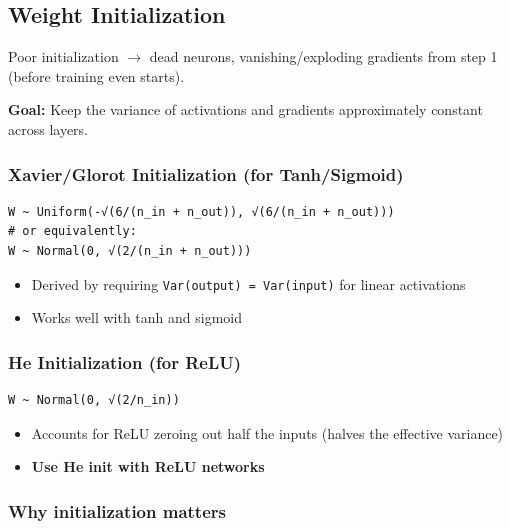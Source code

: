 \documentclass[11pt]{article}
\providecommand{\tightlist}{\setlength{\itemsep}{1pt}\setlength{\parskip}{0pt}}
\begin{document}
\subsection{Weight Initialization}\label{weight-initialization}

Poor initialization \(\rightarrow\) dead neurons, vanishing/exploding gradients from step 1 (before training even starts).

\textbf{Goal:} Keep the variance of activations and gradients approximately constant across layers.

\subsubsection{Xavier/Glorot Initialization (for Tanh/Sigmoid)}\label{xavierglorot-initialization-for-tanhsigmoid}

\setcodelang{}

\begin{verbatim}
W ~ Uniform(-√(6/(n_in + n_out)), √(6/(n_in + n_out)))
# or equivalently:
W ~ Normal(0, √(2/(n_in + n_out)))
\end{verbatim}

\begin{itemize}
\tightlist
\item
  Derived by requiring \texttt{Var(output)\ =\ Var(input)} for linear activations
\item
  Works well with tanh and sigmoid
\end{itemize}

\subsubsection{He Initialization (for ReLU)}\label{he-initialization-for-relu}

\setcodelang{}

\begin{verbatim}
W ~ Normal(0, √(2/n_in))
\end{verbatim}

\begin{itemize}
\tightlist
\item
  Accounts for ReLU zeroing out half the inputs (halves the effective variance)
\item
  \textbf{Use He init with ReLU networks}
\end{itemize}

\subsubsection{Why initialization matters}\label{why-initialization-matters}
\end{document}
